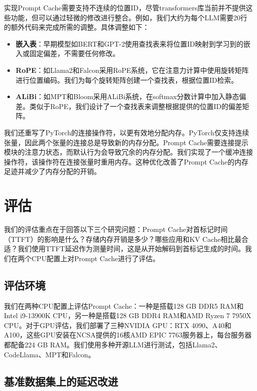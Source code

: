 \documentclass[twocolumn, 10pt]{article} %
\theoremstyle{remark}
\begin{document}
实现Prompt Cache需要支持不连续的位置ID，尽管transformers库当前并不提供这些功能，但可以通过轻微的修改进行整合。例如，我们大约为每个LLM需要20行的额外代码来完成所需的调整。具体调整如下：

\begin{itemize}
    \item \textbf{嵌入表}：早期模型如BERT和GPT-2使用查找表来将位置ID映射到学习到的嵌入或固定偏差，不需要任何修改。
    \item \textbf{RoPE}：如Llama2和Falcon采用RoPE系统，它在注意力计算中使用旋转矩阵进行位置编码。我们为每个旋转矩阵创建一个查找表，根据位置ID检索。
    \item \textbf{ALiBi}：如MPT和Bloom采用ALiBi系统，在softmax分数计算中加入静态偏差。类似于RoPE，我们设计了一个查找表来调整根据提供的位置ID的偏差矩阵。
\end{itemize}

我们还重写了PyTorch的连接操作符，以更有效地分配内存。PyTorch仅支持连续张量，因此两个张量的连接总是导致新的内存分配。Prompt Cache需要连接提示模块的注意力状态，而默认行为会导致冗余的内存分配。我们实现了一个缓冲连接操作符，该操作符在连接张量时重用内存。这种优化改善了Prompt Cache的内存足迹并减少了内存分配的开销。

\section{评估}

我们的评估重点在于回答以下三个研究问题：Prompt Cache对首标记时间（TTFT）的影响是什么？存储内存开销是多少？哪些应用和KV Cache相比最合适？我们使用TTFT延迟作为测量时间，这是从开始解码到首标记生成的时间。我们在两个CPU配置上对Prompt Cache进行了评估。

\subsection{评估环境}

我们在两种CPU配置上评估Prompt Cache：一种是搭载128 GB DDR5 RAM和Intel i9-13900K CPU，另一种是搭载128 GB DDR4 RAM和AMD Ryzen 7 7950X CPU。对于GPU评估，我们部署了三种NVIDIA GPU：RTX 4090、A40和A100，这些GPU安装在NCSA提供的16核AMD EPIC 7763服务器上，每台服务器都配备224 GB RAM。我们使用多种开源LLM进行测试，包括Llama2、CodeLlama、MPT和Falcon。

\subsection{基准数据集上的延迟改进}
\end{document}
